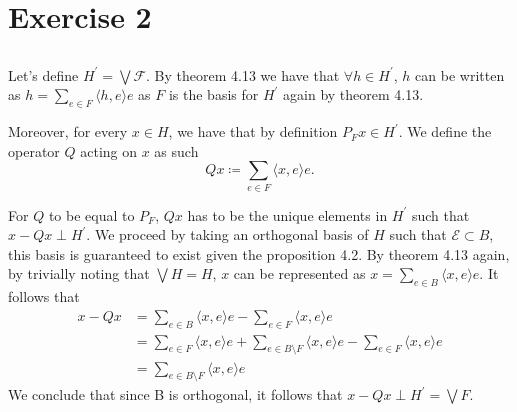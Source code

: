 \documentclass[a4paper,12pt]{article} %
\begin{document}
\section{Exercise 2}
\subsection{}
Let's define \(H^{\prime}  = \bigvee \mathcal{F}\). By theorem 4.13 we have that \(\forall h \in  H^{\prime} \), \(h\) can be written as \(h = \sum_{e \in  F} \langle h,e \rangle e  \) as \(F\) is the basis for \(H^{\prime} \) again by theorem 4.13.

Moreover, for every \(x \in H\), we have that by definition \(P_F x \in  H^{\prime} \).
We define the operator \(Q\) acting on \(x\) as such
\begin{equation}
    Qx \coloneqq \sum_{e \in  F}\langle x,e \rangle e.
\end{equation}

For \(Q\) to be equal to \(P_F\), \(Qx \) has to be the unique elements in \(H^{\prime} \) such that \(x - Qx \perp H^{\prime} \).
We proceed by taking an orthogonal basis of \(H\) such that \(\mathcal{E} \subset B\), this basis is guaranteed to exist given the proposition 4.2.
By theorem 4.13 again, by trivially noting that \(\bigvee H = H\), \(x\) can be represented as \(x=\sum_{e\in B}\langle x,e \rangle e  \).
It follows that
\begin{align*}
    x-Qx & = \sum_{e \in  B}\langle x,e \rangle e - \sum_{e \in  F}\langle x,e \rangle e                                                   \\
         & =  \sum_{e \in F}\langle x,e \rangle e+ \sum_{e \in  B\setminus F}\langle x,e \rangle e  - \sum_{e \in  F}\langle x,e \rangle e \\
         & = \sum_{e \in  B\setminus F}\langle x,e \rangle e
\end{align*}
We conclude that since B is orthogonal, it follows that \(x-Qx \perp H^{\prime} = \bigvee F\).
\end{document}
